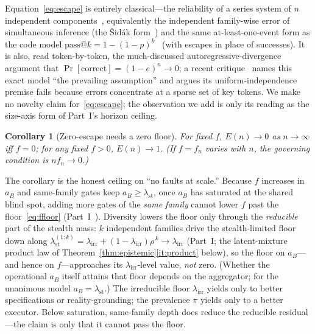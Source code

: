 \documentclass[11pt]{article}
\newtheorem{corollary}{Corollary}
\theoremstyle{definition}
\theoremstyle{remark}
\newcommand{\lst}{\lambda_{\mathrm{st}}}
\newcommand{\lirr}{\lambda_{\mathrm{irr}}}
\newcommand{\Esc}{E}
\newcommand{\fesc}{f}
\begin{document}
Equation~\eqref{eq:escape} is entirely classical---the reliability of a series system of $n$
independent components~\cite{barlowproschan1965}, equivalently the independent family-wise error of
simultaneous inference (the \v{S}id\'ak form~\cite{sidak1967}) and the same at-least-one-event form as
the code model $\mathrm{pass}@k=1-(1-p)^k$~\cite{chen2021,brown2024} (with escapes in place of successes). It is also, read token-by-token, the
much-discussed autoregressive-divergence argument that $\Pr[\text{correct}]=(1-e)^n\to0$; a recent
critique~\cite{arbuzov2025} names this exact model ``the prevailing assumption'' and argues its
uniform-independence premise fails because errors concentrate at a sparse set of key tokens. We make
no novelty claim for~\eqref{eq:escape}; the observation we add is only its reading as the size-axis
form of Part~I's horizon ceiling.

\begin{corollary}[Zero-escape needs a zero floor]\label{cor:zero}
For \emph{fixed} $\fesc$, $\Esc(n)\to0$ as $n\to\infty$ iff $\fesc=0$; for any fixed $\fesc>0$,
$\Esc(n)\to1$. (If $\fesc=\fesc_n$ varies with $n$, the governing condition is $n\fesc_n\to0$.)
\end{corollary}

The corollary is the honest ceiling on ``no faults at scale.'' Because $\fesc$ increases in $a_B$ and
same-family gates keep $a_B\ge\lst$, once $a_B$ has saturated at the shared blind spot, adding more
gates of the \emph{same family} cannot lower $\fesc$ past the floor~\eqref{eq:ffloor}
(Part~I~\cite{matijasevic2026n1}). Diversity lowers the floor only through the \emph{reducible} part of
the stealth mass: $k$ independent families drive the stealth-limited floor down along
$\lst^{(1{:}k)}=\lirr+(1-\lirr)\rho^{\,k}\to\lirr$ (Part~I; the latent-mixture product law of
Theorem~\ref{thm:epistemic}\eqref{it:product} below), so the floor on $a_B$---and hence on
$\fesc$---approaches its $\lirr$-level value, \emph{not} zero. (Whether the operational $a_B$ itself
attains that floor depends on the aggregator; for the unanimous model $a_B=\lst$.) The irreducible floor $\lirr$ yields only to better specifications
or reality-grounding; the prevalence $\pi$ yields only to a better executor. Below saturation,
same-family depth does reduce the reducible residual---the claim is only that it cannot pass the floor.
\end{document}
